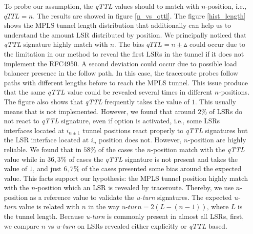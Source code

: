 To probe our assumption, the \textit{qTTL} values should to match with
$n$-position, i.e., $\textit{qTTL}=n$. The
results are showed in figure \ref{n_vs_qttl}. The figure \ref{hist_length} shows the MPLS tunnel length distribution that additionally can help us to understand the amount LSR distributed by position. We principally noticed that \textit{qTTL}
signature highly match with $n$.  The bias $\textit{qTTL}=n \pm \vartriangle $ could
occur due to the limitation in our method to reveal the first LSRs in
the tunnel if it does not implement the RFC4950. %
A second deviation could
occur due to possible load balancer presence in the follow path. In this case,
the traceroute probes follow paths with different lengths before to reach the
MPLS tunnel. This issue
produce that the same \textit{qTTL} value could be revealed several times in different
$n$-positions. The figure also shows that \textit{qTTL} 
frequently takes the value of $1$. This usually  means that \tpropagate is not implemented. However, we found that around $2\%$ of LSRs do not react to \textit{qTTL} signature, even if \tpropagate option is activated, i.e., some LSRs interfaces located at $i_{n\pm 1}$ tunnel positions react properly to \textit{qTTL} signatures but the LSR interface located at $i_n$ position does not.
However, $n$-position are highly reliable. We found that in $58\%$ of the cases the $n$-position match with the
\textit{qTTL} value while in $36,3\%$ of cases the \textit{qTTL} signature is not
present and takes the value of $1$, and just $6,7\%$ of the cases presented
some bias around the expected value. This facts support our hypothesis: the  MPLS tunnel position highly match with the $n$-position  which an LSR is revealed by traceroute. Thereby,  we use
$n$-position as a reference value to validate the \textit{u-turn} signatures. The expected \textit{u-turn} value is related with $n$ in the way $\textit{u-turn}=2(L-(n-1))$, where $L$ is the tunnel length. Because
\textit{u-turn} is commonly present in almost all LSRs, first, we compare $n$ vs \textit{u-turn} on
LSRs  revealed either explicitly or \textit{qTTL} based.

